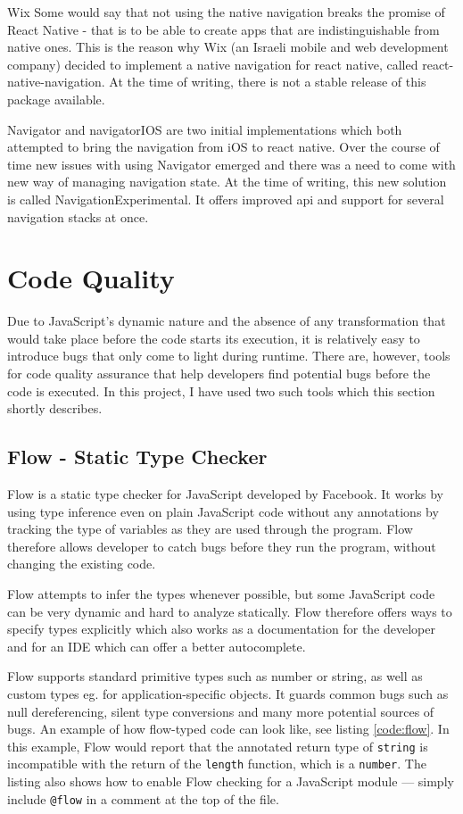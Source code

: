 Wix
Some would say that not using the native navigation breaks the promise of React Native - that is to be able to create apps that are indistinguishable from native ones. This is the reason why Wix (an Israeli mobile and web development company) decided to implement a native navigation for react native, called react-native-navigation. At the time of writing, there is not a stable release of this package available.

Navigator and navigatorIOS are two initial implementations which both attempted to bring the navigation from iOS to react native. Over the course of time new issues with using Navigator emerged and there was a need to come with new way of managing navigation state. At the time of writing, this new solution is called NavigationExperimental. It offers improved api and support for several navigation stacks at once. 



\section{Code Quality}

Due to JavaScript's dynamic nature and the absence of any transformation that would take place before the code starts its execution, it is relatively easy to introduce bugs that only come to light during runtime. There are, however, tools for code quality assurance that help developers find potential bugs before the code is executed. In this project, I have used two such tools which this section shortly describes.

\subsection{Flow - Static Type Checker}

Flow is a static type checker for JavaScript developed by Facebook. It works by using type inference even on plain JavaScript code without any annotations by tracking the type of variables as they are used through the program. Flow therefore allows developer to catch bugs before they run the program, without changing the existing code. 

Flow attempts to infer the types whenever possible, but some JavaScript code can be very dynamic and hard to analyze statically. Flow therefore offers ways to specify types explicitly which also works as a documentation for the developer and for an IDE which can offer a better autocomplete.

Flow supports standard primitive types such as number or string, as well as custom types eg. for application-specific objects. It guards common bugs such as null dereferencing, silent type conversions and many more potential sources of bugs. An example of how flow-typed code can look like, see listing \ref{code:flow}. In this example, Flow would report that the annotated return type of \texttt{string} is incompatible with the return of the \texttt{length} function, which is a \texttt{number}. The listing also shows how to enable Flow checking for a JavaScript module --- simply include \texttt{@flow} in a comment at the top of the file.


